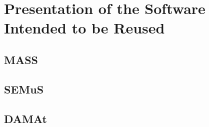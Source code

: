
\chapter{Presentation of the Software Intended to be Reused}

\section{MASS}



\section{SEMuS}



\section{DAMAt}